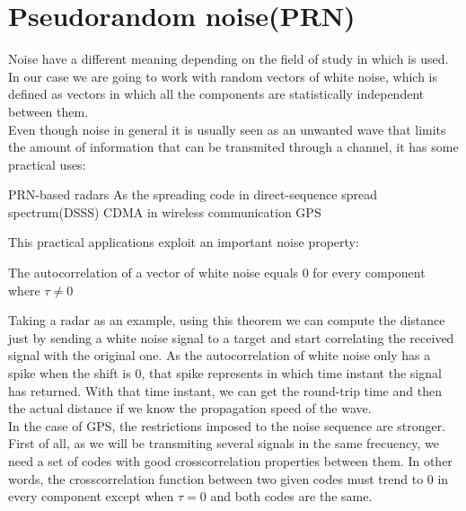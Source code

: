 \section{Pseudorandom noise(PRN)}

Noise have a different meaning depending on the field of study in which is
used. In our case we are going to work with random vectors of white noise,
which is defined as vectors in which all the components are statistically
independent between them.\cite{white_noise}\\

Even though noise in general it is usually seen as an unwanted wave that
limits the amount of information that can be transmited through a
channel\cite{shannon_noise}, it has some practical uses:


\begin{outline}
  \1 PRN-based radars\cite{prn_radar_example1}\cite{prn_radar_example2}
  \1 As the spreading code in direct-sequence spread spectrum(DSSS) \cite{DSSS_1}\cite{DSSS}
    \2 CDMA in wireless communication\cite{DSSS}
    \2 GPS\cite{GPS}
\end{outline}

This practical applications exploit an important noise property:

\begin{property}
  The autocorrelation of a vector of white noise equals 0 for every component
  where $\tau \neq 0$ \cite{everett}
\end{property}

Taking a radar as an example, using this theorem we can compute the distance
just by sending a white noise signal to a target and start correlating the
received signal with the original one. As the autocorrelation of
white noise only has a spike when the shift is 0, that spike represents in
which time instant the signal has returned. With that time instant, we can
get the round-trip time and then the actual distance if we know the
propagation speed of the wave.\\

In the case of GPS, the restrictions imposed to the noise sequence are
stronger. First of all, as we will be transmiting several signals in the same
frecuency, we need a set of codes with good crosscorrelation properties
between them. In other words, the crosscorrelation function between two given
codes must trend to 0 in every component except when $\tau = 0$ and
both codes are the same.\\

